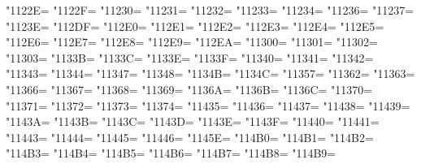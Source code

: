\XeTeXcharclass"1122E=\KclassCM
\XeTeXcharclass"1122F=\KclassCM
\XeTeXcharclass"11230=\KclassCM
\XeTeXcharclass"11231=\KclassCM
\XeTeXcharclass"11232=\KclassCM
\XeTeXcharclass"11233=\KclassCM
\XeTeXcharclass"11234=\KclassCM
\XeTeXcharclass"11236=\KclassCM
\XeTeXcharclass"11237=\KclassCM
\XeTeXcharclass"1123E=\KclassCM
\XeTeXcharclass"112DF=\KclassCM
\XeTeXcharclass"112E0=\KclassCM
\XeTeXcharclass"112E1=\KclassCM
\XeTeXcharclass"112E2=\KclassCM
\XeTeXcharclass"112E3=\KclassCM
\XeTeXcharclass"112E4=\KclassCM
\XeTeXcharclass"112E5=\KclassCM
\XeTeXcharclass"112E6=\KclassCM
\XeTeXcharclass"112E7=\KclassCM
\XeTeXcharclass"112E8=\KclassCM
\XeTeXcharclass"112E9=\KclassCM
\XeTeXcharclass"112EA=\KclassCM
\XeTeXcharclass"11300=\KclassCM
\XeTeXcharclass"11301=\KclassCM
\XeTeXcharclass"11302=\KclassCM
\XeTeXcharclass"11303=\KclassCM
\XeTeXcharclass"1133B=\KclassCM
\XeTeXcharclass"1133C=\KclassCM
\XeTeXcharclass"1133E=\KclassCM
\XeTeXcharclass"1133F=\KclassCM
\XeTeXcharclass"11340=\KclassCM
\XeTeXcharclass"11341=\KclassCM
\XeTeXcharclass"11342=\KclassCM
\XeTeXcharclass"11343=\KclassCM
\XeTeXcharclass"11344=\KclassCM
\XeTeXcharclass"11347=\KclassCM
\XeTeXcharclass"11348=\KclassCM
\XeTeXcharclass"1134B=\KclassCM
\XeTeXcharclass"1134C=\KclassCM
\XeTeXcharclass"11357=\KclassCM
\XeTeXcharclass"11362=\KclassCM
\XeTeXcharclass"11363=\KclassCM
\XeTeXcharclass"11366=\KclassCM
\XeTeXcharclass"11367=\KclassCM
\XeTeXcharclass"11368=\KclassCM
\XeTeXcharclass"11369=\KclassCM
\XeTeXcharclass"1136A=\KclassCM
\XeTeXcharclass"1136B=\KclassCM
\XeTeXcharclass"1136C=\KclassCM
\XeTeXcharclass"11370=\KclassCM
\XeTeXcharclass"11371=\KclassCM
\XeTeXcharclass"11372=\KclassCM
\XeTeXcharclass"11373=\KclassCM
\XeTeXcharclass"11374=\KclassCM
\XeTeXcharclass"11435=\KclassCM
\XeTeXcharclass"11436=\KclassCM
\XeTeXcharclass"11437=\KclassCM
\XeTeXcharclass"11438=\KclassCM
\XeTeXcharclass"11439=\KclassCM
\XeTeXcharclass"1143A=\KclassCM
\XeTeXcharclass"1143B=\KclassCM
\XeTeXcharclass"1143C=\KclassCM
\XeTeXcharclass"1143D=\KclassCM
\XeTeXcharclass"1143E=\KclassCM
\XeTeXcharclass"1143F=\KclassCM
\XeTeXcharclass"11440=\KclassCM
\XeTeXcharclass"11441=\KclassCM
\XeTeXcharclass"11443=\KclassCM
\XeTeXcharclass"11444=\KclassCM
\XeTeXcharclass"11445=\KclassCM
\XeTeXcharclass"11446=\KclassCM
\XeTeXcharclass"1145E=\KclassCM
\XeTeXcharclass"114B0=\KclassCM
\XeTeXcharclass"114B1=\KclassCM
\XeTeXcharclass"114B2=\KclassCM
\XeTeXcharclass"114B3=\KclassCM
\XeTeXcharclass"114B4=\KclassCM
\XeTeXcharclass"114B5=\KclassCM
\XeTeXcharclass"114B6=\KclassCM
\XeTeXcharclass"114B7=\KclassCM
\XeTeXcharclass"114B8=\KclassCM
\XeTeXcharclass"114B9=\KclassCM
